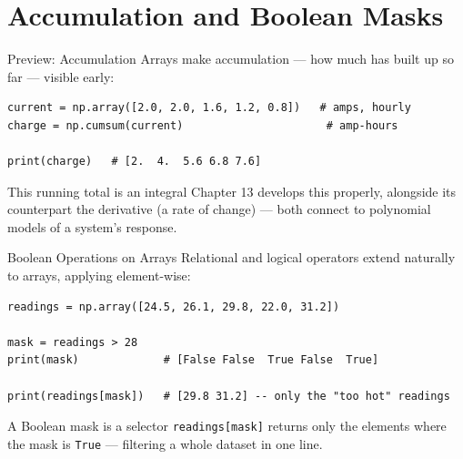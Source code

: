 \documentclass[9pt,aspectratio=169,xcolor=table]{beamer}
\begin{document}
\section{Accumulation and Boolean Masks}

\begin{frame}[fragile]{Preview: Accumulation}
    \leavevmode
    Arrays make \alert{accumulation} --- how much has built up so far
    --- visible early:

\begin{lstlisting}
current = np.array([2.0, 2.0, 1.6, 1.2, 0.8])   # amps, hourly
charge = np.cumsum(current)                      # amp-hours

print(charge)   # [2.  4.  5.6 6.8 7.6]
\end{lstlisting}

    \vspace{2mm}
    \begin{block}{This running total is an integral}
        Chapter 13 develops this properly, alongside its counterpart
        the \alert{derivative} (a rate of change) --- both connect to
        polynomial models of a system's response.
    \end{block}
\end{frame}

\begin{frame}[fragile]{Boolean Operations on Arrays}
    \leavevmode
    Relational and logical operators extend naturally to arrays,
    applying \alert{element-wise}:

\begin{lstlisting}
readings = np.array([24.5, 26.1, 29.8, 22.0, 31.2])

mask = readings > 28
print(mask)             # [False False  True False  True]

print(readings[mask])   # [29.8 31.2] -- only the "too hot" readings
\end{lstlisting}

    \vspace{2mm}
    \begin{alertblock}{A Boolean mask is a selector}
        \texttt{readings[mask]} returns only the elements where the
        mask is \texttt{True} --- filtering a whole dataset in one line.
    \end{alertblock}
\end{frame}

\end{document}
